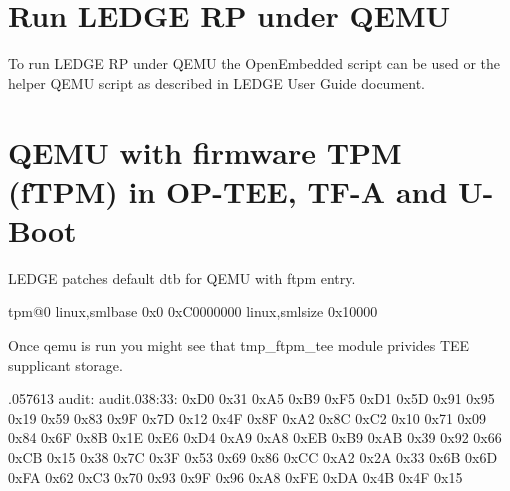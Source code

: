 \documentclass[a4paper,10pt,oneside,english]{sphinxmanual}
\begin{document}
\section{Run LEDGE RP under QEMU}
\label{\detokenize{chapter4-internals:run-ledge-rp-under-qemu}}
To run LEDGE RP under QEMU the  OpenEmbedded script can be used or the helper QEMU script as described in LEDGE User Guide document.


\section{QEMU with firmware TPM (fTPM) in OP-TEE, TF-A and U-Boot}
\label{\detokenize{chapter4-internals:qemu-with-firmware-tpm-ftpm-in-op-tee-tf-a-and-u-boot}}
LEDGE patches default dtb for QEMU with ftpm entry.

\begin{sphinxVerbatim}[commandchars=\\\{\}]
tpm@0 
          
        linux,sml\PYGZhy{}base  \PYGZlt{}0x0 0xC0000000\PYGZgt{}
        linux,sml\PYGZhy{}size  \PYGZlt{}0x10000\PYGZgt{}
\end{sphinxVerbatim}

Once qemu is run you might see that tmp\_ftpm\_tee module privides TEE supplicant storage.

\begin{sphinxVerbatim}[commandchars=\\\{\}]
\PYGZti{} 
\PYGZti{} 
\PYG{o}{[}  .057613\PYG{o}{]} audit:  audit.038:33:     
0xD0 0x31 0xA5 0xB9 0xF5 0xD1 0x5D 0x91 0x95 0x19 0x59 0x83 0x9F 0x7D 0x12 0x4F 0x8F 0xA2 0x8C 0xC2 0x10 0x71 0x09 0x84 0x6F 0x8B 0x1E 0xE6 0xD4 0xA9 0xA8 0xEB 0xB9 0xAB 0x39 0x92 0x66 0xCB 0x15 0x38 0x7C 0x3F 0x53 0x69 0x86 0xCC 0xA2 0x2A 0x33 0x6B 0x6D 0xFA 0x62 0xC3 0x70 0x93 0x9F 0x96 0xA8 0xFE 0xDA 0x4B 0x4F 0x15
\end{sphinxVerbatim}
\end{document}
